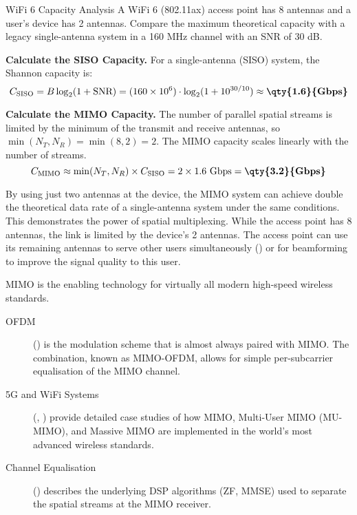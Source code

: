 \begin{workedexample}{WiFi 6 Capacity Analysis}
     A WiFi 6 (802.11ax) access point has 8 antennas and a user's device has 2 antennas. Compare the maximum theoretical capacity with a legacy single-antenna system in a 160 MHz channel with an SNR of 30 dB.
    
    \begin{derivationsteps}
        \step \textbf{Calculate the SISO Capacity.} For a single-antenna (SISO) system, the Shannon capacity is:
        \[ C_{\text{SISO}} = B \log_2(1 + \text{SNR}) = (160 \times 10^6) \cdot \log_2(1 + 10^{30/10}) \approx \textbf{\qty{1.6}{Gbps}} \]
        
        \step \textbf{Calculate the MIMO Capacity.} The number of parallel spatial streams is limited by the minimum of the transmit and receive antennas, so $\min(N_T, N_R) = \min(8, 2) = 2$. The MIMO capacity scales linearly with the number of streams.
        \[ C_{\text{MIMO}} \approx \min(N_T, N_R) \times C_{\text{SISO}} = 2 \times 1.6 \text{ Gbps} = \textbf{\qty{3.2}{Gbps}} \]
    \end{derivationsteps}
    
     By using just two antennas at the device, the MIMO system can achieve double the theoretical data rate of a single-antenna system under the same conditions. This demonstrates the power of spatial multiplexing. While the access point has 8 antennas, the link is limited by the device's 2 antennas. The access point can use its remaining antennas to serve other users simultaneously () or for beamforming to improve the signal quality to this user.
\end{workedexample}


\begin{importantbox}[title={Further Reading}]
    MIMO is the enabling technology for virtually all modern high-speed wireless standards.
    \begin{description}
        \item[OFDM] () is the modulation scheme that is almost always paired with MIMO. The combination, known as MIMO-OFDM, allows for simple per-subcarrier equalisation of the MIMO channel.
        \item[5G and WiFi Systems] (, ) provide detailed case studies of how MIMO, Multi-User MIMO (MU-MIMO), and Massive MIMO are implemented in the world's most advanced wireless standards.
        \item[Channel Equalisation] () describes the underlying DSP algorithms (ZF, MMSE) used to separate the spatial streams at the MIMO receiver.
    \end{description}
\end{importantbox}
